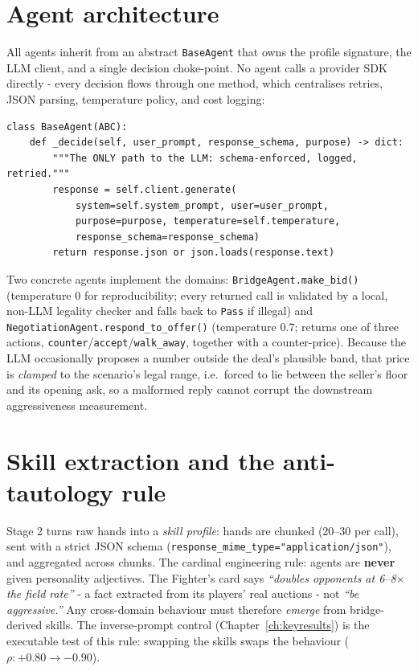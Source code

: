 \documentclass[11pt, a4paper, oneside, openany]{report}
\begin{document}
\section{Agent architecture}
All agents inherit from an abstract \texttt{BaseAgent} that owns the profile
signature, the LLM client, and a single decision choke-point. No agent calls
a provider SDK directly - every decision flows through one method, which
centralises retries, JSON parsing, temperature policy, and cost logging:

\begin{lstlisting}
class BaseAgent(ABC):
    def _decide(self, user_prompt, response_schema, purpose) -> dict:
        """The ONLY path to the LLM: schema-enforced, logged, retried."""
        response = self.client.generate(
            system=self.system_prompt, user=user_prompt,
            purpose=purpose, temperature=self.temperature,
            response_schema=response_schema)
        return response.json or json.loads(response.text)
\end{lstlisting}

Two concrete agents implement the domains: \texttt{BridgeAgent.make\_bid()}
(temperature $0$ for reproducibility; every returned call is validated by a
local, non-LLM legality checker and falls back to \texttt{Pass} if illegal)
and \texttt{NegotiationAgent.respond\_to\_offer()} (temperature $0.7$;
returns one of three actions, \texttt{counter}/\texttt{accept}/\texttt{walk\_away},
together with a counter-price). Because the LLM occasionally proposes a number
outside the deal's plausible band, that price is \emph{clamped} to the
scenario's legal range, i.e.\ forced to lie between the seller's floor and its
opening ask, so a malformed reply cannot corrupt the downstream
aggressiveness measurement.

\section{Skill extraction and the anti-tautology rule}
Stage 2 turns raw hands into a \emph{skill profile}: hands are chunked
(20--30 per call), sent with a strict JSON schema
(\texttt{response\_mime\_type="application/json"}), and aggregated across
chunks. The cardinal engineering rule: agents are \textbf{never} given
personality adjectives. The Fighter's card says \emph{``doubles opponents at
6--8$\times$ the field rate''} - a fact extracted from its players' real
auctions - not \emph{``be aggressive.''} Any cross-domain behaviour must
therefore \emph{emerge} from bridge-derived skills. The inverse-prompt
control (Chapter~\ref{ch:keyresults}) is the executable test of this rule:
swapping the skills swaps the behaviour ($\rho: +0.80 \rightarrow -0.90$).
\end{document}
